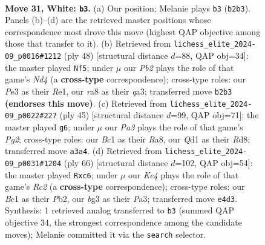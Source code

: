 \documentclass[11pt]{article}
\begin{document}
\clearpage

\begin{figure}[p]\centering
\begin{subfigure}{0.46\textwidth}\centering
\resizebox{\linewidth}{!}{%
\newchessgame
\chessboard[
  setfen={r6r/4k2p/1pp1p1p1/8/1p1PK2P/P3Pnb1/RP4q1/2BQ4 w - - 0 31},
  showmover=false,
  pgfstyle=straightmove, color=movearrow, markmove={b2-b3}
]}
\caption{}
\end{subfigure}\hfill
\begin{subfigure}{0.46\textwidth}\centering
\resizebox{\linewidth}{!}{%
\newchessgame
\chessboard[
  setfen={b1r3k1/5pp1/1Q3n1p/3P4/p1PN4/qP1B2P1/5PP1/4R1K1 w - - 0 25},
  showmover=false,
  pgfstyle=straightmove, color=movearrow, markmove={d4-f5}
]}
\caption{}
\end{subfigure}
\\[4pt]
\begin{subfigure}{0.46\textwidth}\centering
\resizebox{\linewidth}{!}{%
\newchessgame
\chessboard[
  setfen={r2rb1k1/pp3ppp/4pP2/2qp3Q/8/1PN1P1R1/1B4BP/6K1 b - - 0 23},
  showmover=false,
  pgfstyle=straightmove, color=movearrow, markmove={g7-g6}
]}
\caption{}
\end{subfigure}\hfill
\begin{subfigure}{0.46\textwidth}\centering
\resizebox{\linewidth}{!}{%
\newchessgame
\chessboard[
  setfen={4q1k1/6b1/2n1p1Pr/pB1pP3/3B2Qp/P6P/1PR5/4K3 w - - 5 34},
  showmover=false,
  pgfstyle=straightmove, color=movearrow, markmove={c2-c6}
]}
\caption{}
\end{subfigure}
\caption{\textbf{Move 31, White: \texttt{b3}.} (a) Our position; Melanie plays \texttt{b3} (\texttt{b2b3}). Panels (b)--(d) are the retrieved master positions whose correspondence most drove this move (highest QAP objective among those that transfer to it). (b) Retrieved from \texttt{lichess\_elite\_2024-09\_p0016\#1212} (ply 48) [structural distance $d$=88, QAP obj=34]: the master played \texttt{Nf5}; under $\mu$ our \emph{Pb2} plays the role of that game's \emph{Nd4} (a \textbf{cross-type} correspondence); cross-type roles: our \emph{P}e3 as their \emph{R}e1, our \emph{r}a8 as their \emph{q}a3; transferred move \texttt{b2b3} \textbf{(endorses this move)}. (c) Retrieved from \texttt{lichess\_elite\_2024-09\_p0022\#227} (ply 45) [structural distance $d$=99, QAP obj=71]: the master played \texttt{g6}; under $\mu$ our \emph{Pa3} plays the role of that game's \emph{Pg2}; cross-type roles: our \emph{B}c1 as their \emph{R}a8, our \emph{Q}d1 as their \emph{R}d8; transferred move \texttt{a3a4}. (d) Retrieved from \texttt{lichess\_elite\_2024-09\_p0031\#1204} (ply 66) [structural distance $d$=102, QAP obj=54]: the master played \texttt{Rxc6}; under $\mu$ our \emph{Ke4} plays the role of that game's \emph{Rc2} (a \textbf{cross-type} correspondence); cross-type roles: our \emph{B}c1 as their \emph{P}b2, our \emph{b}g3 as their \emph{P}a3; transferred move \texttt{e4d3}. Synthesis: 1 retrieved analog transferred to \texttt{b3} (summed QAP objective 34, the strongest correspondence among the candidate moves); Melanie committed it via the \texttt{search} selector.}
\label{fig:thought-m60}
\end{figure}
\end{document}
